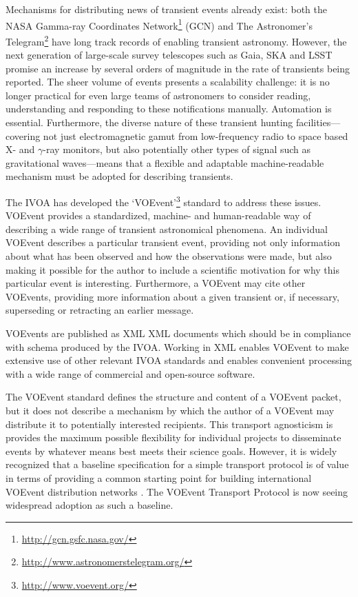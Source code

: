 \documentclass[5p,authoryear]{elsarticle}
\begin{document}
Mechanisms for distributing news of transient events already exist: both the
NASA Gamma-ray Coordinates Network\footnote{\url{http://gcn.gsfc.nasa.gov/}}
(GCN) and The Astronomer's
Telegram\footnote{\url{http://www.astronomerstelegram.org/}} have long track
records of enabling transient astronomy. However, the next generation of
large-scale survey telescopes such as Gaia, SKA and LSST promise an increase
by several orders of magnitude in the rate of transients being reported.  The
sheer volume of events presents a scalability challenge: it is no longer
practical for even large teams of astronomers to consider reading,
understanding and responding to these notifications manually. Automation is
essential. Furthermore, the diverse nature of these transient hunting
facilities---covering not just electromagnetic gamut from low-frequency radio
to space based X- and $\gamma$-ray monitors, but also potentially other types
of signal such as gravitational waves---means that a flexible and adaptable
machine-readable mechanism must be adopted for describing transients.

The IVOA has developed the `VOEvent'\footnote{\url{http://www.voevent.org/}}
\citep{Seaman:2011} standard to address these issues. VOEvent provides a
standardized, machine- and human-readable way of describing a wide range of
transient astronomical phenomena. An individual VOEvent describes a particular
transient event, providing not only information about what has been observed
and how the observations were made, but also making it possible for the author
to include a scientific motivation for why this particular event is
interesting.  Furthermore, a VOEvent may cite other VOEvents, providing more
information about a given transient or, if necessary, superseding or
retracting an earlier message.

VOEvents are published as XML \citep{Bray:2008} XML documents which should be
in compliance with schema \citep{Gau:2012, Peterson:2012} produced by the
IVOA. Working in XML enables VOEvent to make extensive use of other relevant
IVOA standards and enables convenient processing with a wide range of
commercial and open-source software.

The VOEvent standard defines the structure and content of a VOEvent packet,
but it does not describe a mechanism by which the author of a VOEvent may
distribute it to potentially interested recipients. This transport agnosticism
is provides the maximum possible flexibility for individual projects to
disseminate events by whatever means best meets their science goals. However,
it is widely recognized that a baseline specification for a simple transport
protocol is of value in terms of providing a common starting point for
building international VOEvent distribution networks \citep{Williams:2012}.
The VOEvent Transport Protocol \citep[VTP;][]{Allan:2009} is now seeing
widespread adoption as such a baseline.
\end{document}
